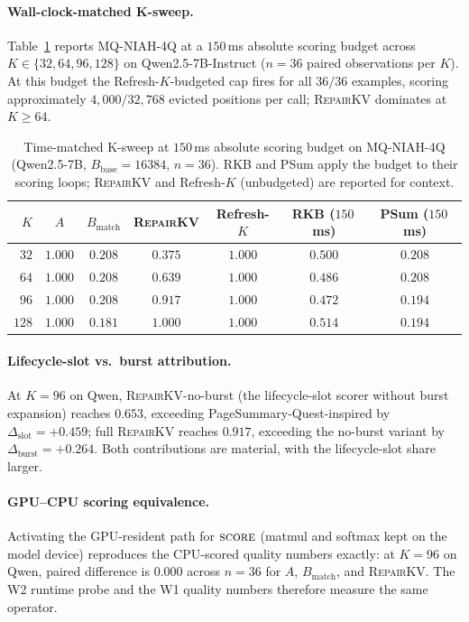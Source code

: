 \documentclass{article}
\newcommand{\repairkv}{\textsc{RepairKV}}
\newcommand{\bbase}{\ensuremath{B_{\mathrm{base}}}}
\newcommand{\bmatch}{\ensuremath{B_{\mathrm{match}}}}
\begin{document}
\paragraph{Wall-clock-matched K-sweep.} Table~\ref{tab:p18-tightksweep} reports MQ-NIAH-4Q at a $150$\,ms absolute scoring budget across $K\in\{32,64,96,128\}$ on Qwen2.5-7B-Instruct ($n{=}36$ paired observations per $K$). At this budget the Refresh-$K$-budgeted cap fires for all $36/36$ examples, scoring approximately $4{,}000/32{,}768$ evicted positions per call; \repairkv{} dominates at $K\geq 64$.

\begin{table}[H]
  \centering
  \small
  \setlength{\tabcolsep}{4pt}
  \caption{Time-matched K-sweep at $150$\,ms absolute scoring budget on MQ-NIAH-4Q (Qwen2.5-7B, $\bbase{=}16384$, $n{=}36$). RKB and PSum apply the budget to their scoring loops; \repairkv{} and Refresh-$K$ (unbudgeted) are reported for context.}
  \label{tab:p18-tightksweep}
  \begin{tabular}{@{}rcccccc@{}}
    \toprule
    $K$ & $A$ & $\bmatch$ & \repairkv{} & Refresh-$K$ & RKB ($150$\,ms) & PSum ($150$\,ms) \\
    \midrule
    $32$  & $1.000$ & $0.208$ & $0.375$ & $1.000$ & $0.500$ & $0.208$ \\
    $64$  & $1.000$ & $0.208$ & $0.639$ & $1.000$ & $0.486$ & $0.208$ \\
    $96$  & $1.000$ & $0.208$ & $0.917$ & $1.000$ & $0.472$ & $0.194$ \\
    $128$ & $1.000$ & $0.181$ & $1.000$ & $1.000$ & $0.514$ & $0.194$ \\
    \bottomrule
  \end{tabular}
\end{table}

\paragraph{Lifecycle-slot vs.\ burst attribution.} At $K{=}96$ on Qwen, \repairkv{}-no-burst (the lifecycle-slot scorer without burst expansion) reaches $0.653$, exceeding PageSummary-Quest-inspired by $\Delta_\text{slot}{=}{+}0.459$; full \repairkv{} reaches $0.917$, exceeding the no-burst variant by $\Delta_\text{burst}{=}{+}0.264$. Both contributions are material, with the lifecycle-slot share larger.

\paragraph{GPU--CPU scoring equivalence.} Activating the GPU-resident path for $\textsc{score}$ (matmul and softmax kept on the model device) reproduces the CPU-scored quality numbers exactly: at $K{=}96$ on Qwen, paired difference is $0.000$ across $n{=}36$ for $A$, $\bmatch$, and \repairkv{}. The W2 runtime probe and the W1 quality numbers therefore measure the same operator.
\end{document}
